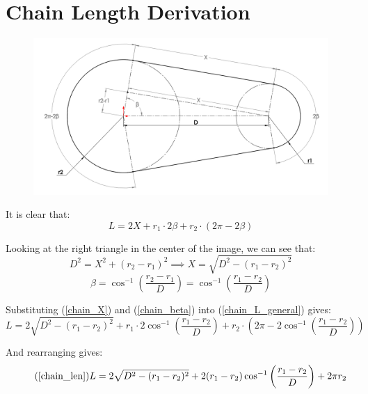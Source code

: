 \documentclass[11pt,a4paper,titlepage]{article}
\begin{document}
	\section{Chain Length Derivation} \label{appendixD}

	\begin{figure}[H]
		\centering
		\includegraphics[width=\linewidth]{Chain_Derivation}
	\end{figure}
	
	It is clear that:
	\begin{equation} \label{chain_L_general}
		L = 2 X + r_1 \cdot 2 \beta + r_2 \cdot (2 \pi - 2 \beta)
	\end{equation}
	
	Looking at the right triangle in the center of the image, we can see that:
	\begin{equation} \label{chain_X}
		D^2 = X^2 + (r_2 - r_1)^2 \implies X = \sqrt{D^2 - (r_1 - r_2)^2}
	\end{equation}
	\begin{equation} \label{chain_beta}
		\beta = \cos^{-1} \left( \frac{r_2 - r_1}{D} \right) = \cos^{-1} \left( \frac{r_1 - r_2}{D} \right)
	\end{equation}
	
	Substituting (\ref{chain_X}) and (\ref{chain_beta}) into (\ref{chain_L_general}) gives:
	\begin{equation}
		L = 2 \sqrt{D^2 - (r_1 - r_2)^2} + r_1 \cdot 2 \cos^{-1} \left( \frac{r_1 - r_2}{D} \right) + r_2 \cdot \left( 2 \pi - 2 \cos^{-1} \left( \frac{r_1 - r_2}{D} \right) \right)
	\end{equation}
	
	And rearranging gives:
	\begin{equation} \tag{\ref*{chain_len}}
		L = 2 \sqrt{D^2 - (r_1 - r_2)^2} + 2 (r_1 - r_2) \cos^{-1} \left( \frac{r_1 - r_2}{D} \right) + 2 \pi r_2
	\end{equation}
	
\end{document}
